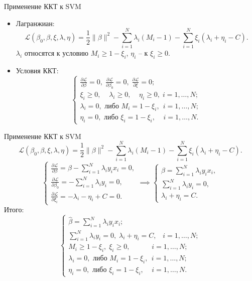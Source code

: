 \documentclass[9pt]{beamer}
\begin{document}
\begin{frame}{Применение ККТ к SVM}
\begin{itemize}
    \item Лагранжиан:
        \begin{equation*}
        \mathcal{L}(\beta_0, \beta, \xi, \lambda, \eta) = \frac{1}{2}\|\beta\|^2 - \sum_{i=1}^N\lambda_i(M_i - 1) - \sum_{i=1}^N\xi_i(\lambda_i + \eta_i - C).
        \end{equation*}
    $\lambda_i$ относятся к условию $M_i \geq 1 - \xi_i$, $\eta_i$ -- к $\xi_i \geq 0$.
    \item Условия ККТ:
    $$
    \begin{cases}
        \frac{\partial\mathcal{L}}{\partial \beta}=0, \; \frac{\partial\mathcal{L}}{\partial \beta_0}=0, \; \frac{\partial\mathcal{L}}{\partial \xi}=0;\\
        \xi_i \geq 0,\;\;\;\; \lambda_i \geq 0, \;\;\;\; \eta_i \geq 0, \; i=1,\ldots,N;\\
        \lambda_i = 0, \text{ либо } M_i = 1 - \xi_i, \;\, i=1,\ldots,N;\\
        \eta_i = 0, \text{ либо } \xi_i = 1 - \xi_i, \;\;\;\; i=1,\ldots,N.
    \end{cases}
    $$
\end{itemize}
\end{frame}

\begin{frame}{Применение ККТ к SVM}
    $$
    \mathcal{L}(\beta_0, \beta, \xi, \lambda, \eta) = \frac{1}{2}\|\beta\|^2 - \sum_{i=1}^N\lambda_i(M_i - 1) - \sum_{i=1}^N\xi_i(\lambda_i + \eta_i - C).
    $$
    $$\begin{cases}
        \frac{\partial\mathcal{L}}{\partial \beta}= \beta - \sum\limits_{i=1}^N \lambda_iy_ix_i = 0,\\
        \frac{\partial\mathcal{L}}{\partial \beta_0}= - \sum\limits_{i=1}^N \lambda_iy_i = 0,\\
        \frac{\partial\mathcal{L}}{\partial \xi_i}= -\lambda_i - \eta_i + C = 0.
    \end{cases}
    \implies
    \begin{cases}
        \beta = \sum\limits_{i=1}^N \lambda_iy_ix_i,\\
        \sum\limits_{i=1}^N \lambda_iy_i = 0,\\
        \lambda_i + \eta_i = C.
    \end{cases}
    $$
    Итого:
    $$\begin{cases}
        \hat\beta = \sum\limits_{i=1}^N \lambda_iy_ix_i;\\
        \sum\limits_{i=1}^N \lambda_iy_i = 0, \;\lambda_i + \eta_i = C,\;\;\; i=1,\ldots,N;\\
        M_i \geq 1 - \xi_i, \;\xi_i \geq 0, \;\;\;\;\;\;\;\;\;\;\; i=1,\ldots,N;\\
        \lambda_i = 0, \text{ либо } M_i = 1 - \xi_i, \;\, i=1,\ldots,N;\\
        \eta_i = 0, \text{ либо } \xi_i = 1 - \xi_i, \;\;\;\; i=1,\ldots,N.
    \end{cases}$$
\end{frame}
\end{document}
